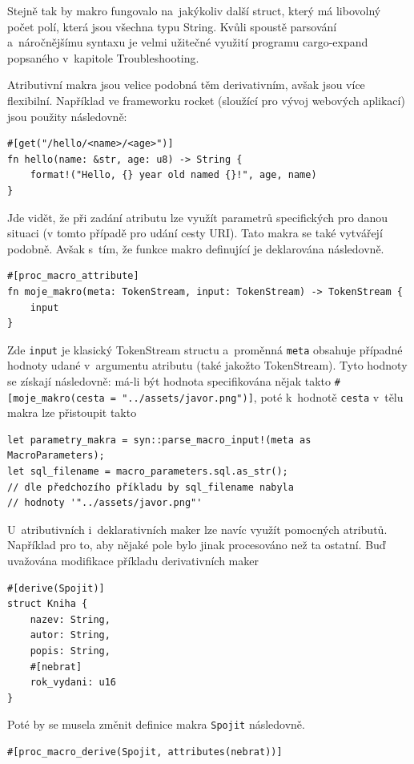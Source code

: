 \documentclass[a4paper, 12pt]{article} %
\newcommand{\rust}[1]{\texttt{#1}}
\begin{document}
			Stejně tak by makro fungovalo na~jakýkoliv další struct, který má libovolný počet polí, která jsou všechna typu String. Kvůli spoustě parsování a~náročnějšímu syntaxu je velmi užitečné využití programu cargo-expand popsaného v~kapitole Troubleshooting.
			
			Atributivní makra jsou velice podobná těm derivativním, avšak jsou více flexibilní. Například ve frameworku rocket (sloužící pro vývoj webových aplikací) jsou použity následovně: 
			\begin{verbatim}
#[get("/hello/<name>/<age>")]
fn hello(name: &str, age: u8) -> String {
	format!("Hello, {} year old named {}!", age, name)
}
			\end{verbatim}
			\cite{rocket}
			
			Jde vidět, že při zadání atributu lze využít parametrů specifických pro danou situaci (v tomto případě pro udání cesty URI). Tato makra se také vytvářejí podobně. Avšak s~tím, že funkce makro definující je deklarována následovně.
			\begin{verbatim}
#[proc_macro_attribute]
fn moje_makro(meta: TokenStream, input: TokenStream) -> TokenStream {
	input
} 
			\end{verbatim}
			
			Zde \rust{input} je klasický TokenStream structu a~proměnná \rust{meta} obsahuje případné hodnoty udané v~argumentu atributu (také jakožto TokenStream). Tyto hodnoty se získají následovně: má-li být hodnota specifikována nějak takto \linebreak\texttt{\#[moje\_makro(cesta = "../assets/javor.png")]}, poté k~hodnotě \rust{cesta} v~tělu makra lze přistoupit takto
			\begin{verbatim}
let parametry_makra = syn::parse_macro_input!(meta as MacroParameters);
let sql_filename = macro_parameters.sql.as_str();
// dle předchozího příkladu by sql_filename nabyla
// hodnoty '"../assets/javor.png"'
			\end{verbatim}
			\cite{atrib_makro}
			
			U~atributivních i~deklarativních maker lze navíc využít pomocných atributů. Například pro to, aby nějaké pole bylo jinak procesováno než ta ostatní. Buď uvažována modifikace příkladu derivativních maker
			\begin{verbatim}
#[derive(Spojit)]
struct Kniha {
	nazev: String,
	autor: String,
	popis: String,
	#[nebrat]
	rok_vydani: u16
}
			\end{verbatim}
			
			
			Poté by se musela změnit definice makra \texttt{Spojit} následovně.
			\begin{verbatim}
#[proc_macro_derive(Spojit, attributes(nebrat))]
			\end{verbatim}
			
\end{document}
